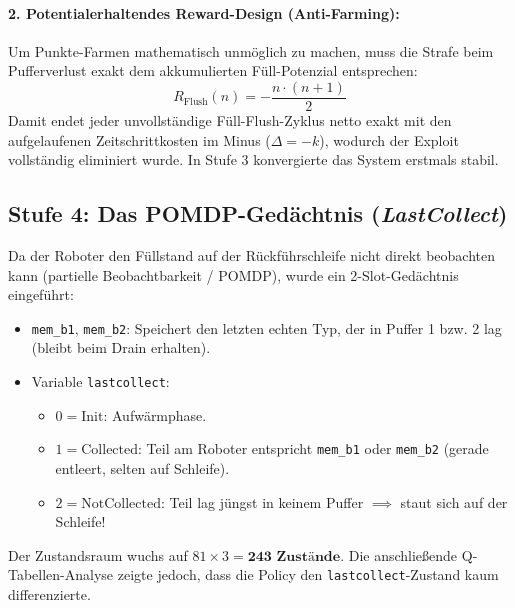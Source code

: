 \documentclass[11pt,a4paper]{article}
\begin{document}
\paragraph{2. Potentialerhaltendes Reward-Design (Anti-Farming):}
Um Punkte-Farmen mathematisch unmöglich zu machen, muss die Strafe beim Pufferverlust exakt dem akkumulierten Füll-Potenzial entsprechen:
\begin{equation}
  R_{\text{Flush}}(n) = -\frac{n \cdot (n + 1)}{2}
\end{equation}
Damit endet jeder unvollständige Füll-Flush-Zyklus netto exakt mit den aufgelaufenen Zeitschrittkosten im Minus ($\Delta = -k$), wodurch der Exploit vollständig eliminiert wurde. In Stufe 3 konvergierte das System erstmals stabil.

\subsection{Stufe 4: Das POMDP-Gedächtnis (\textit{LastCollect})}
Da der Roboter den Füllstand auf der Rückführschleife nicht direkt beobachten kann (partielle Beobachtbarkeit / POMDP), wurde ein 2-Slot-Gedächtnis eingeführt:
\begin{itemize}
  \item \texttt{mem\_b1}, \texttt{mem\_b2}: Speichert den letzten echten Typ, der in Puffer 1 bzw. 2 lag (bleibt beim Drain erhalten).
  \item Variable \texttt{lastcollect}:
    \begin{itemize}
      \item $0 = \text{Init}$: Aufwärmphase.
      \item $1 = \text{Collected}$: Teil am Roboter entspricht \texttt{mem\_b1} oder \texttt{mem\_b2} (gerade entleert, selten auf Schleife).
      \item $2 = \text{NotCollected}$: Teil lag jüngst in keinem Puffer $\implies$ staut sich auf der Schleife!
    \end{itemize}
\end{itemize}
Der Zustandsraum wuchs auf $81 \times 3 = \mathbf{243 \text{ Zustände}}$. Die anschließende Q-Tabellen-Analyse zeigte jedoch, dass die Policy den \texttt{lastcollect}-Zustand kaum differenzierte.

\end{document}
